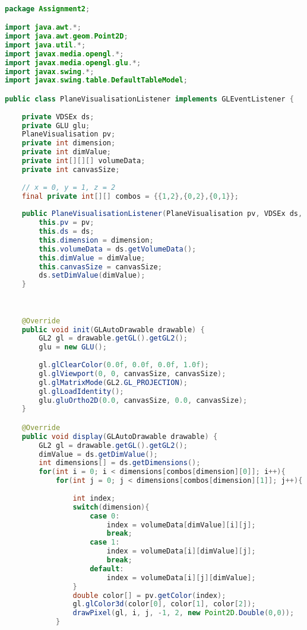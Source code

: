 \documentclass[pdftex,a4paper,10pt,titlepage]{article}
\begin{document}
\begin{lstlisting}[language=java, breaklines=true]

package Assignment2;

import java.awt.*;
import java.awt.geom.Point2D;
import java.util.*;
import javax.media.opengl.*;
import javax.media.opengl.glu.*;
import javax.swing.*;
import javax.swing.table.DefaultTableModel;

public class PlaneVisualisationListener implements GLEventListener {
    
    private VDSEx ds;
    private GLU glu;
    PlaneVisualisation pv;
    private int dimension;
    private int dimValue;
    private int[][][] volumeData;
    private int canvasSize;
    
    // x = 0, y = 1, z = 2
    final private int[][] combos = {{1,2},{0,2},{0,1}};
    
    public PlaneVisualisationListener(PlaneVisualisation pv, VDSEx ds, int dimension, int dimValue, int canvasSize){
        this.pv = pv;
        this.ds = ds;
        this.dimension = dimension;
        this.volumeData = ds.getVolumeData();
        this.dimValue = dimValue;
        this.canvasSize = canvasSize;
        ds.setDimValue(dimValue);
    }
    
    

    @Override
    public void init(GLAutoDrawable drawable) {
        GL2 gl = drawable.getGL().getGL2();
        glu = new GLU();
        
        gl.glClearColor(0.0f, 0.0f, 0.0f, 1.0f);
        gl.glViewport(0, 0, canvasSize, canvasSize);
        gl.glMatrixMode(GL2.GL_PROJECTION);
        gl.glLoadIdentity();
        glu.gluOrtho2D(0.0, canvasSize, 0.0, canvasSize);
    }

    @Override
    public void display(GLAutoDrawable drawable) {
        GL2 gl = drawable.getGL().getGL2();
        dimValue = ds.getDimValue();
        int dimensions[] = ds.getDimensions();
        for(int i = 0; i < dimensions[combos[dimension][0]]; i++){
            for(int j = 0; j < dimensions[combos[dimension][1]]; j++){
                
                int index;
                switch(dimension){
                    case 0:
                        index = volumeData[dimValue][i][j];
                        break;
                    case 1:
                        index = volumeData[i][dimValue][j];
                        break;
                    default:
                        index = volumeData[i][j][dimValue];
                }
                double color[] = pv.getColor(index);
                gl.glColor3d(color[0], color[1], color[2]);
                drawPixel(gl, i, j, -1, 2, new Point2D.Double(0,0));
            }
            

\end{lstlisting}
\end{document}
